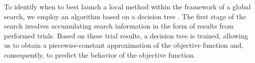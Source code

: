 \documentclass[runningheads]{llncs}
\begin{document}
To identify when to best launch a local method  within the framework of a global search, we employ an algorithm based on a decision tree  \cite{Barkalov2023_2}. The first stage of the search involves accumulating search information in the form of results from performed trials. Based on these trial results, a decision tree is trained, allowing us to obtain a piecewise-constant approximation of the objective function and, consequently, to predict the behavior of the objective function.





\end{document}

